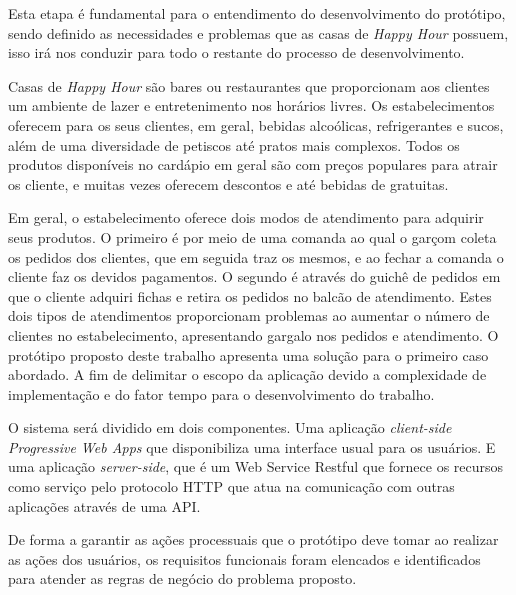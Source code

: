 Esta etapa é fundamental para o entendimento do desenvolvimento do protótipo, sendo definido as necessidades e problemas que as casas de \textit{Happy Hour} possuem, isso irá nos conduzir para todo o restante do processo de desenvolvimento.

Casas de \textit{Happy Hour} são bares ou restaurantes que proporcionam aos clientes um ambiente  de lazer e entretenimento  nos horários livres. Os estabelecimentos oferecem para os seus clientes, em geral, bebidas alcoólicas, refrigerantes e sucos, além de uma diversidade de petiscos até pratos mais complexos. Todos os produtos disponíveis no cardápio em geral são com preços populares para atrair os cliente, e muitas vezes oferecem descontos e até bebidas de gratuitas.

Em geral, o estabelecimento oferece dois modos de atendimento para adquirir seus produtos. O primeiro é por meio de uma comanda ao qual o garçom coleta os pedidos dos clientes, que em seguida traz os mesmos, e ao fechar a comanda o cliente faz os devidos pagamentos. O segundo é através do guichê de pedidos em que o cliente adquiri fichas e retira os pedidos no balcão de atendimento. Estes dois tipos de atendimentos proporcionam problemas ao aumentar o número de clientes no estabelecimento, apresentando gargalo nos pedidos e atendimento. O protótipo proposto deste trabalho apresenta uma solução para o primeiro caso abordado. A fim de delimitar o escopo da aplicação devido a complexidade de implementação e do fator tempo para o desenvolvimento do trabalho.

O sistema será dividido em dois componentes. Uma aplicação \textit{client-side} \textit{Progressive Web Apps} que disponibiliza uma interface usual para os usuários. E uma aplicação \textit{server-side}, que é um Web Service Restful que fornece os recursos como serviço pelo protocolo HTTP que atua na comunicação com outras aplicações através de uma API.

De forma a garantir as ações processuais que o protótipo deve tomar ao realizar as ações dos usuários, os requisitos funcionais foram elencados e identificados para atender as regras de negócio do problema proposto.


